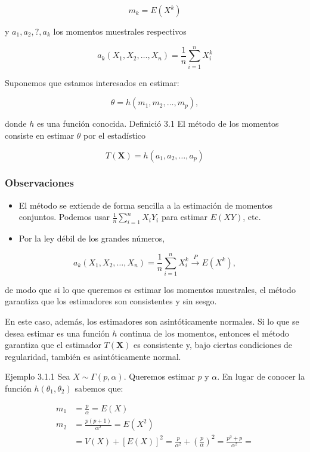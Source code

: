 \documentclass[
]{article}
\providecommand{\tightlist}{%
  \setlength{\itemsep}{0pt}\setlength{\parskip}{0pt}}
\begin{document}
\[
m_{k}=E\left(X^{k}\right)
\]

y \(a_{1}, a_{2}, ?, a_{k}\) los momentos muestrales respectivos

\[
a_{k}\left(X_{1}, X_{2}, \ldots, X_{n}\right)=\frac{1}{n} \sum_{i=1}^{n} X_{i}^{k}
\]

Suponemos que estamos interesados en estimar:

\[
\theta=h\left(m_{1}, m_{2}, \ldots, m_{p}\right),
\]

donde \(h\) es una función conocida.
Definició 3.1 El método de los momentos consiste en estimar \(\theta\) por el estadístico

\[
T(\mathbf{X})=h\left(a_{1}, a_{2}, \ldots, a_{p}\right)
\]

\subsubsection{Observaciones}\label{observaciones}

\begin{itemize}
\tightlist
\item
  El método se extiende de forma sencilla a la estimación de momentos conjuntos. Podemos usar \(\frac{1}{n} \sum_{i=1}^{n} X_{i} Y_{i}\) para estimar \(E(X Y)\), etc.
\item
  Por la ley débil de los grandes números,
\end{itemize}

\[
a_{k}\left(X_{1}, X_{2}, \ldots, X_{n}\right)=\frac{1}{n} \sum_{i=1}^{n} X_{i}^{k} \xrightarrow{P} E\left(X^{k}\right),
\]

de modo que si lo que queremos es estimar los momentos muestrales, el método garantiza que los estimadores son consistentes y sin sesgo.

En este caso, además, los estimadores son asintóticamente normales. Si lo que se desea estimar es una función \(h\) continua de los momentos, entonces el método garantiza que el estimador \(T(\mathbf{X})\) es consistente y, bajo ciertas condiciones de regularidad, también es asintóticamente normal.

Ejemplo 3.1.1 Sea \(X \sim \Gamma(p, \alpha)\). Queremos estimar \(p\) y \(\alpha\). En lugar de conocer la función \(h\left(\theta_{1}, \theta_{2}\right)\) sabemos que:

\[
\begin{aligned}
m_{1} & =\frac{p}{\alpha}=E(X) \\
m_{2} & =\frac{p(p+1)}{\alpha^{2}}=E\left(X^{2}\right) \\
& =V(X)+[E(X)]^{2}=\frac{p}{\alpha^{2}}+\left(\frac{p}{\alpha}\right)^{2}=\frac{p^{2}+p}{\alpha^{2}}=
\end{aligned}
\]
\end{document}
